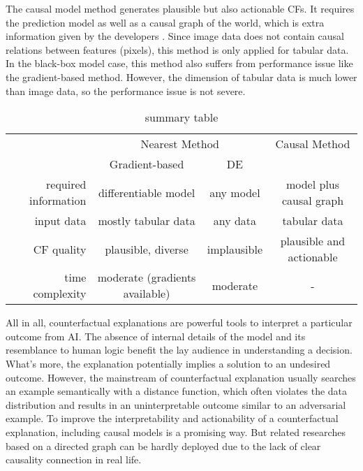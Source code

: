 The causal model method generates plausible but also actionable CFs. It requires the prediction model as well as a causal graph of the world, which is extra information given by the developers \cite{preservingCausal}. Since image data does not contain causal relations between features (pixels), this method is only applied for tabular data. In the black-box model case, this method also suffers from performance issue like the gradient-based method. However, the dimension of tabular data is much lower than image data, so the performance issue is not severe.

\begin{table}
  \centering
\caption{summary table}
\begin{tabular}{|r|c|c|c|}
  \hline
   & \multicolumn{2}{c|}{Nearest Method} & Causal Method\\
   \cline{2-3}
   & Gradient-based & DE &  \\
   \hline
  required information & differentiable model  & any model & model plus causal graph \\
  input data & mostly tabular data & any data & tabular data \\
  CF quality & plausible, diverse& implausible& plausible and actionable\\
  time complexity & moderate (gradients available) &moderate& -\\
  \hline
\end{tabular}

\label{summary table}
  \end{table}
All in all, counterfactual explanations are powerful tools to interpret a particular outcome from AI. The absence of internal details of the model and its resemblance to human logic benefit the lay audience in understanding a decision. What's more, the explanation potentially implies a solution to an undesired outcome. However, the mainstream of counterfactual explanation usually searches an example semantically with a distance function, which often violates the data distribution and results in an uninterpretable outcome similar to an adversarial example. To improve the interpretability and actionability of a counterfactual explanation, including causal models is a promising way. But related researches based on a directed graph can be hardly deployed due to the lack of clear causality connection in real life.    